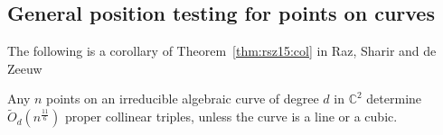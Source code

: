 \subsection{General position testing for points on curves}%
\label{sec:paper:3pol-algorithm:application:gpt}


The following is a corollary of Theorem~\ref{thm:rsz15:col} in Raz, Sharir and de Zeeuw~\cite{RSZ15}
\begin{corollary}
	Any $n$ points on an irreducible algebraic curve of degree $d$ in
	$\mathbb{C}^2$ determine
	$\tilde{O}_d(n^{\frac{11}{6}})$ proper collinear triples, unless the curve is a line or a cubic.
\end{corollary}

